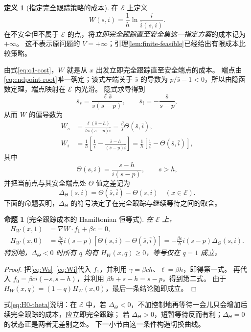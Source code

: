 \documentclass[11pt,a4paper,UTF8]{ctexart}
\newtheorem{proposition}[theorem]{命题}
\theoremstyle{definition}
\newtheorem{definition}[theorem]{定义}
\begin{document}
\begin{definition}[指定完全跟踪策略的成本]
\label{def:W}
在 $\mathcal E$ 上定义
\begin{equation}
W(s,i)=\frac1h\ln\frac{i}{\bar i(s,i)}.
\label{eq:W}
\end{equation}
在不安全但不属于 $\mathcal E$ 的点，将\emph{立即完全跟踪直至安全集这一指定方案}的成本记为 $+\infty$。
这不表示原问题的 $V=+\infty$；引理\ref{lem:finite-feasible}已经给出有限成本比较策略。
\end{definition}
由式\eqref{eq:q1-cost}，$W$ 就是从 $x$ 出发立即完全跟踪直至安全端点的成本。
端点由\eqref{eq:endpoint-root}唯一确定；该式左端关于 $\bar s$ 的导数为 $p/\bar s-1<0$，所以由隐函数定理，端点映射在 $\mathcal E$ 内光滑。
隐式求导得到
\begin{equation}
\bar s_s=\frac{\ell\bar s}{s(\bar s-p)},\qquad
\bar s_i=-\frac{\bar s}{\bar s-p},
\label{eq:endpoint-derivatives}
\end{equation}
从而 $W$ 的偏导数为
\begin{align}
W_s&=\frac{\ell(\bar s-h)}{hs(\bar s-p)\bar i}
=\frac \beta s\Theta(\bar s,\bar i),\label{eq:Ws}\\
W_i&=\frac1h\left[\frac1i-\frac{\bar s-h}{(\bar s-p)\bar i}\right]
=\frac1h\left[\frac1i-\Theta(\bar s,\bar i)\right],\label{eq:Wi}
\end{align}
其中
\begin{equation}
\Theta(s,i)=\frac{s-h}{i(s-p)},\qquad s>h,
\label{eq:Theta}
\end{equation}
并把当前点与其安全端点处 $\Theta$ 值之差记为
\begin{equation}
\Delta_\Theta(s,i)=\Theta(\bar s,\bar i)-\Theta(s,i)\quad(x\in\mathcal E).
\label{eq:D-residual}
\end{equation}
下面的命题表明，$\Delta_\Theta$ 的符号决定了在完全跟踪与继续等待之间的取舍。

\begin{proposition}[完全跟踪成本的 Hamiltonian 恒等式]
\label{prop:W-HJB}
在 $\mathcal E$ 上，
\begin{align}
H_W(x,1)&=\nabla W\cdot f_1+\beta c=0,\label{eq:H1-zero}\\
H_W(x,0)&=\frac{\beta c}{h}i(s-p)[\Theta(s,i)-\Theta(\bar s,\bar i)]
=-\frac{\beta c}{h}i(s-p)\Delta_\Theta(s,i).\label{eq:H0-theta}
\end{align}
特别地，$\Delta_\Theta<0$ 时所有 $q$ 均有 $H_W(x,q)\ge0$，等号仅在 $q=1$ 成立。
\end{proposition}
\begin{proof}
把\eqref{eq:Ws}--\eqref{eq:Wi}代入 $f_1$，并利用 $\gamma=\beta ch$、$\ell=\beta h$，即得第一式。
再代入 $f_0=\beta ci(-s,s-h)$，并利用 $\beta h+s-h=s-p$，得到第二式。
由于 $H_W(x,q)=(1-q)H_W(x,0)$，最后一条结论随即成立。
\end{proof}
式\eqref{eq:H0-theta}说明：在 $\mathcal E$ 中，若 $\Delta_\Theta<0$，不加控制地再等待一会儿只会增加后续完全跟踪的成本，应立即完全跟踪；
若 $\Delta_\Theta>0$，短暂等待反而有利；$\Delta_\Theta=0$ 的状态正是两者无差别之处。
下一小节由这一条件构造切换曲线。
\end{document}
